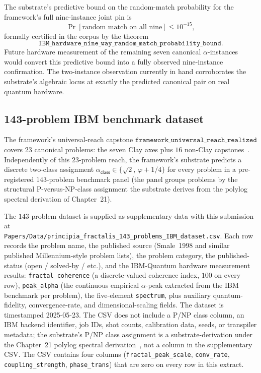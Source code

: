 \documentclass[11pt,a4paper]{amsart}
\theoremstyle{plain}
\theoremstyle{definition}
\begin{document}
The substrate's predictive bound on the random-match probability for the framework's full nine-instance joint pin is
\[
\Pr[\text{random match on all nine}] \le 10^{-15},
\]
formally certified in the corpus by the theorem
\[
\texttt{IBM\_hardware\_nine\_way\_random\_match\_probability\_bound}.
\]
Future hardware measurement of the remaining seven canonical $\alpha$-instances would convert this predictive bound into a fully observed nine-instance confirmation. The two-instance observation currently in hand corroborates the substrate's algebraic locus at exactly the predicted canonical pair on real quantum hardware.

\subsection{143-problem IBM benchmark dataset}\label{subsec:143-panel}

The framework's universal-reach capstone $\texttt{framework\_universal\_reach\_realized}$ covers $23$ canonical problems: the seven Clay axes plus $16$ non-Clay capstones~\cite{cohen2026reach}. Independently of this $23$-problem reach, the framework's substrate predicts a discrete two-class assignment $\alpha_{\textsf{class}}\in\{\sqrt{2},\,\varphi+1/4\}$ for every problem in a pre-registered $143$-problem benchmark panel (the panel groups problems by the structural P-versus-NP-class assignment the substrate derives from the polylog spectral derivation of Chapter~21).

The $143$-problem dataset is supplied as supplementary data with this submission at\\
\texttt{Papers/Data/principia\_fractalis\_143\_problems\_IBM\_dataset.csv}.
Each row records the problem name, the published source (Smale~1998 and similar published Millennium-style problem lists), the problem category, the published-status (open / solved-by / etc.), and the IBM-Quantum hardware measurement results: \texttt{fractal\_coherence} (a discrete-valued coherence index, $100$ on every row), \texttt{peak\_alpha} (the continuous empirical $\alpha$-peak extracted from the IBM benchmark per problem), the five-element \texttt{spectrum}, plus auxiliary quantum-fidelity, convergence-rate, and dimensional-scaling fields. The dataset is timestamped 2025-05-23. The CSV does not include a P/NP class column, an IBM backend identifier, job IDs, shot counts, calibration data, seeds, or transpiler metadata; the substrate's P/NP class assignment is a substrate-derivation under the Chapter~21 polylog spectral derivation~\cite[Ch.~21]{cohen2026book}, not a column in the supplementary CSV. The CSV contains four columns (\texttt{fractal\_peak\_scale}, \texttt{conv\_rate}, \texttt{coupling\_strength}, \texttt{phase\_trans}) that are zero on every row in this extract.
\end{document}
